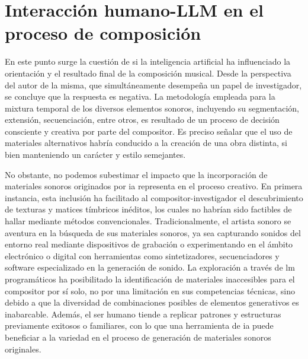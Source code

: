 \section{Interacción humano-LLM en el proceso de composición}

En este punto surge la cuestión de si la inteligencia artificial ha influenciado la orientación y el resultado final de la composición musical. Desde la perspectiva del autor de la misma, que simultáneamente desempeña un papel de investigador, se concluye que la respuesta es negativa. La metodología empleada para la mixtura temporal de los diversos elementos sonoros, incluyendo su segmentación, extensión, secuenciación, entre otros, es resultado de un proceso de decisión consciente y creativa por parte del compositor. Es preciso señalar que el uso de materiales alternativos habría conducido a la creación de una obra distinta, si bien manteniendo un carácter y estilo semejantes.

No obstante, no podemos subestimar el impacto que la incorporación de materiales sonoros originados por \gls{ia} representa en el proceso creativo. En primera instancia, esta inclusión ha facilitado al compositor-investigador el descubrimiento de texturas y matices tímbricos inéditos, los cuales no habrían sido factibles de hallar mediante métodos convencionales. Tradicionalmente, el artista sonoro se aventura en la búsqueda de sus materiales sonoros, ya sea capturando sonidos del entorno real mediante dispositivos de grabación o experimentando en el ámbito electrónico o digital con herramientas como sintetizadores, secuenciadores y software especializado en la generación de sonido. La exploración a través de \gls{lm} programáticos ha posibilitado la identificación de materiales inaccesibles para el compositor por sí solo, no por una limitación en sus competencias técnicas, sino debido a que la diversidad de combinaciones posibles de elementos generativos es inabarcable. Además, el ser humano tiende a replicar patrones y estructuras previamente exitosos o familiares, con lo que una herramienta de \gls{ia} puede beneficiar a la variedad en el proceso de generación de materiales sonoros originales.

